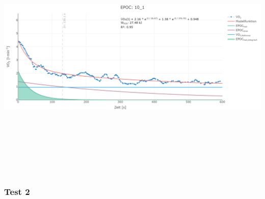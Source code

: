 \documentclass[
  letterpaper,
  DIV=11]{scrartcl}
\begin{document}
\includegraphics[width=11.45833in,height=4.6875in]{images/10_1.png}

\subsubsection{Test 2}
\end{document}
